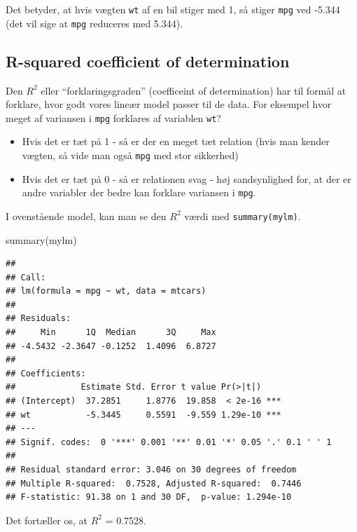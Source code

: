 \documentclass[
]{book}
\newenvironment{Shaded}{\begin{snugshade}}{\end{snugshade}}
\newcommand{\FunctionTok}[1]{\textcolor[rgb]{0.00,0.00,0.00}{#1}}
\newcommand{\NormalTok}[1]{#1}
\providecommand{\tightlist}{%
  \setlength{\itemsep}{0pt}\setlength{\parskip}{0pt}}
\begin{document}
Det betyder, at hvis vægten \texttt{wt} af en bil stiger med 1, så stiger \texttt{mpg} ved -5.344 (det vil sige at \texttt{mpg} reduceres med 5.344).

\hypertarget{r-squared-coefficient-of-determination}{%
\subsection{R-squared coefficient of determination}\label{r-squared-coefficient-of-determination}}

Den \(R^2\) eller ``forklaringsgraden'' (coefficeint of determination) har til formål at forklare, hvor godt vores lineær model passer til de data. For eksempel hvor meget af variansen i \texttt{mpg} forklares af variablen \texttt{wt}?

\begin{itemize}
\tightlist
\item
  Hvis det er tæt på 1 - så er der en meget tæt relation (hvis man kender vægten, så vide man også \texttt{mpg} med stor sikkerhed)
\item
  Hvis det er tæt på 0 - så er relationen svag - høj sandsynlighed for, at der er andre variabler der bedre kan forklare variansen i \texttt{mpg}.
\end{itemize}

I ovenstående model, kan man se den \(R^2\) værdi med \texttt{summary(mylm)}.

\begin{Shaded}
\begin{Highlighting}[]
\FunctionTok{summary}\NormalTok{(mylm)}
\end{Highlighting}
\end{Shaded}

\begin{verbatim}
## 
## Call:
## lm(formula = mpg ~ wt, data = mtcars)
## 
## Residuals:
##     Min      1Q  Median      3Q     Max 
## -4.5432 -2.3647 -0.1252  1.4096  6.8727 
## 
## Coefficients:
##             Estimate Std. Error t value Pr(>|t|)    
## (Intercept)  37.2851     1.8776  19.858  < 2e-16 ***
## wt           -5.3445     0.5591  -9.559 1.29e-10 ***
## ---
## Signif. codes:  0 '***' 0.001 '**' 0.01 '*' 0.05 '.' 0.1 ' ' 1
## 
## Residual standard error: 3.046 on 30 degrees of freedom
## Multiple R-squared:  0.7528, Adjusted R-squared:  0.7446 
## F-statistic: 91.38 on 1 and 30 DF,  p-value: 1.294e-10
\end{verbatim}

Det fortæller os, at \(R^2\) = 0.7528.
\end{document}
